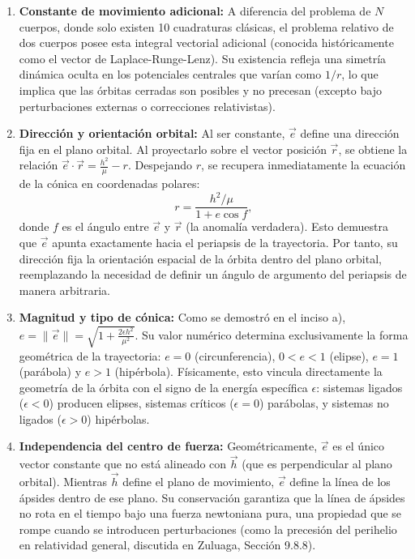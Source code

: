 \documentclass[12pt, a4paper]{article}
\begin{document}
\begin{enumerate}
    \item \textbf{Constante de movimiento adicional:} A diferencia del problema de $N$ cuerpos, donde solo existen 10 cuadraturas clásicas, el problema relativo de dos cuerpos posee esta integral vectorial adicional (conocida históricamente como el vector de Laplace-Runge-Lenz). Su existencia refleja una simetría dinámica oculta en los potenciales centrales que varían como $1/r$, lo que implica que las órbitas cerradas son posibles y no precesan (excepto bajo perturbaciones externas o correcciones relativistas).
    
    \item \textbf{Dirección y orientación orbital:} Al ser constante, $\vec{e}$ define una dirección fija en el plano orbital. Al proyectarlo sobre el vector posición $\vec{r}$, se obtiene la relación $\vec{e} \cdot \vec{r} = \frac{h^2}{\mu} - r$. Despejando $r$, se recupera inmediatamente la ecuación de la cónica en coordenadas polares:
    $$
    r = \frac{h^2/\mu}{1 + e \cos f},
    $$
    donde $f$ es el ángulo entre $\vec{e}$ y $\vec{r}$ (la anomalía verdadera). Esto demuestra que $\vec{e}$ apunta exactamente hacia el periapsis de la trayectoria. Por tanto, su dirección fija la orientación espacial de la órbita dentro del plano orbital, reemplazando la necesidad de definir un ángulo de argumento del periapsis de manera arbitraria.
    
    \item \textbf{Magnitud y tipo de cónica:} Como se demostró en el inciso a), $e = \|\vec{e}\| = \sqrt{1 + \frac{2\epsilon h^2}{\mu^2}}$. Su valor numérico determina exclusivamente la forma geométrica de la trayectoria: $e=0$ (circunferencia), $0<e<1$ (elipse), $e=1$ (parábola) y $e>1$ (hipérbola). Físicamente, esto vincula directamente la geometría de la órbita con el signo de la energía específica $\epsilon$: sistemas ligados ($\epsilon < 0$) producen elipses, sistemas críticos ($\epsilon = 0$) parábolas, y sistemas no ligados ($\epsilon > 0$) hipérbolas.
    
    \item \textbf{Independencia del centro de fuerza:} Geométricamente, $\vec{e}$ es el único vector constante que no está alineado con $\vec{h}$ (que es perpendicular al plano orbital). Mientras $\vec{h}$ define el plano de movimiento, $\vec{e}$ define la línea de los ápsides dentro de ese plano. Su conservación garantiza que la línea de ápsides no rota en el tiempo bajo una fuerza newtoniana pura, una propiedad que se rompe cuando se introducen perturbaciones (como la precesión del perihelio en relatividad general, discutida en Zuluaga, Sección 9.8.8).
\end{enumerate}
\end{document}
